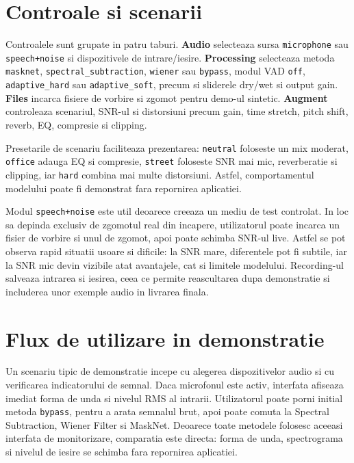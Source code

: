 \documentclass[12pt,a4paper]{report}
\begin{document}
\section{Controale si scenarii}

Controalele sunt grupate in patru taburi. \textbf{Audio} selecteaza sursa
\texttt{microphone} sau \texttt{speech+noise} si dispozitivele de intrare/iesire.
\textbf{Processing} selecteaza metoda \texttt{masknet},
\texttt{spectral\_subtraction}, \texttt{wiener} sau \texttt{bypass}, modul VAD
\texttt{off}, \texttt{adaptive\_hard} sau \texttt{adaptive\_soft}, precum si
sliderele dry/wet si output gain. \textbf{Files} incarca fisiere de vorbire si
zgomot pentru demo-ul sintetic. \textbf{Augment} controleaza scenariul, SNR-ul
si distorsiuni precum gain, time stretch, pitch shift, reverb, EQ, compresie si
clipping.

Presetarile de scenariu faciliteaza prezentarea: \texttt{neutral} foloseste un
mix moderat, \texttt{office} adauga EQ si compresie, \texttt{street} foloseste
SNR mai mic, reverberatie si clipping, iar \texttt{hard} combina mai multe
distorsiuni. Astfel, comportamentul modelului poate fi demonstrat fara
repornirea aplicatiei.

Modul \texttt{speech+noise} este util deoarece creeaza un mediu de test
controlat. In loc sa depinda exclusiv de zgomotul real din incapere,
utilizatorul poate incarca un fisier de vorbire si unul de zgomot, apoi poate
schimba SNR-ul live. Astfel se pot observa rapid situatii usoare si dificile:
la SNR mare, diferentele pot fi subtile, iar la SNR mic devin vizibile atat
avantajele, cat si limitele modelului. Recording-ul salveaza intrarea si
iesirea, ceea ce permite reascultarea dupa demonstratie si includerea unor
exemple audio in livrarea finala.

\section{Flux de utilizare in demonstratie}

Un scenariu tipic de demonstratie incepe cu alegerea dispozitivelor audio si cu
verificarea indicatorului de semnal. Daca microfonul este activ, interfata
afiseaza imediat forma de unda si nivelul RMS al intrarii. Utilizatorul poate
porni initial metoda \texttt{bypass}, pentru a arata semnalul brut, apoi poate
comuta la Spectral Subtraction, Wiener Filter si MaskNet. Deoarece toate metodele
folosesc aceeasi interfata de monitorizare, comparatia este directa: forma de
unda, spectrograma si nivelul de iesire se schimba fara repornirea aplicatiei.
\end{document}
